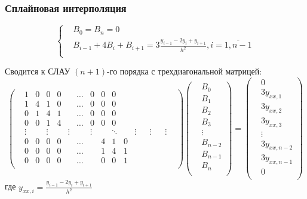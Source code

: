\documentclass[10pt]{beamer}
\begin{document}
\begin{frame}[fragile]
\frametitle{Сплайновая интерполяция}
$$
\left\lbrace
\begin{aligned}
&B_0 = B_n = 0\\
&B_{i-1} +  4 B_{i} + B_{i+1} = 3 \frac{y_{i-1} - 2 y_{i} + y_{i+1}}{h^2} , i = \overline{1, n-1}\\
\end{aligned}
\right.
$$

Сводится к СЛАУ $(n+1)$-го порядка с трехдиагональной матрицей:
$$
\left(
\begin{aligned}
  & 1 & 0 & 0 & 0 & &\hdots& 0 & 0 & 0 &\\
  & 1 & 4 & 1 & 0 & &\hdots& 0 & 0 & 0 &\\
  & 0 & 1 & 4 & 1 & &\hdots& 0 & 0 & 0 &\\
  & 0 & 0 & 1 & 4 & &\hdots& 0 & 0 & 0 &\\
  &\vdots& &\vdots& &\vdots& &\vdots& &\ddots& &\vdots& &\vdots& &\vdots& \\
  & 0 & 0 & 0 & 0 & &\hdots&  & 4 & 1 & 0 &\\
  & 0 & 0 & 0 & 0 & &\hdots&  & 1 & 4 & 1 &\\
  & 0 & 0 & 0 & 0 & &\hdots&  & 0 & 0 & 1 &\\
\end{aligned}
\right)
\left(
\begin{aligned}
&B_0\\
&B_1\\
&B_2\\
&B_3\\
&\vdots\\
&B_{n-2}\\
&B_{n-1}\\
&B_n\\
\end{aligned}
\right)
=
\left(
\begin{aligned}
&0\\
&3 {y}_{xx, 1} \\
&3 {y}_{xx, 2} \\
&3 {y}_{xx, 3} \\
&\vdots\\
&3 {y}_{xx, n-2} \\
&3 {y}_{xx, n-1} \\
&0\\
\end{aligned}
\right)
$$
где 
${y}_{xx, i} = \frac{y_{i-1} - 2 y_{i} + y_{i+1}}{h^2}$

\end{frame}
\end{document}
